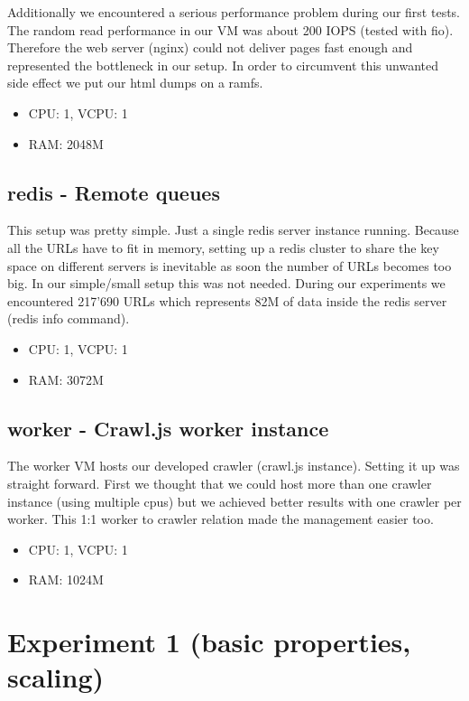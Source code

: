 Additionally we encountered a serious performance problem during our first tests. The random read performance in our VM was about 200 IOPS (tested with fio). Therefore the web server (nginx) could not deliver pages fast enough and represented the bottleneck in our setup. In order to circumvent this unwanted side effect we put our html dumps on a ramfs.

\begin{itemize}
  \item CPU: 1, VCPU: 1
  \item RAM: 2048M
\end{itemize}

\subsection{redis - Remote queues}
This setup was pretty simple. Just a single redis server instance running. Because all the URLs have to fit in memory, setting up a redis cluster to share the key space on different servers is inevitable as soon the number of URLs becomes too big. In our simple/small setup this was not needed. During our experiments we encountered 217'690 URLs which represents 82M of data inside the redis server (redis info command).

\begin{itemize}
  \item CPU: 1, VCPU: 1
  \item RAM: 3072M
\end{itemize}

\subsection{worker - Crawl.js worker instance}
The worker VM hosts our developed crawler (crawl.js instance). Setting it up was straight forward. First we thought that we could host more than one crawler instance (using multiple cpus) but we achieved better results with one crawler per worker. This 1:1 worker to crawler relation made the management easier too.

\begin{itemize}
  \item CPU: 1, VCPU: 1
  \item RAM: 1024M
\end{itemize}

\section{Experiment 1 (basic properties, scaling)}

